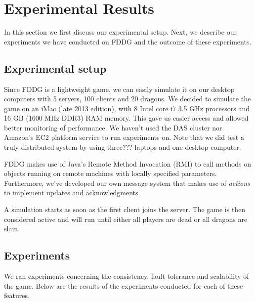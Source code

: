 \section{Experimental Results}
	In this section we first discuss our experimental setup. Next, we describe our experiments we have conducted on FDDG and the outcome of these experiments.

\subsection{Experimental setup}
\label{subsec:experimental_setup}

	Since FDDG is a lightweight game, we can easily simulate it on our desktop computers with 5 servers, 100 clients and 20 dragons. 
	We decided to simulate the game on an iMac (late 2013 edition), with 8 Intel core i7 3.5 GHz processors and 16 GB (1600 MHz DDR3) RAM memory. 
	This gave us easier access and allowed better monitoring of performance.
	We haven't used the DAS cluster nor Amazon's EC2 platform service to run experiments on. 
	Note that we did test a truly distributed system by using three??? laptops and one desktop computer.
	
	FDDG makes use of Java's Remote Method Invocation (RMI) to call methods on objects running on remote machines with locally specified parameters. 
	Furthermore, we've developed our own message system that makes use of \emph{actions} to implement updates and acknowledgments.
	
	A simulation starts as soon as the first client joins the server. The game is then considered active and will run until either all players are dead or all dragons are slain.


\subsection{Experiments}
\label{subsec:experiments}
	We ran experiments concerning the consistency, fault-tolerance and scalability of the game. Below are the results of the experiments conducted for each of these features.

